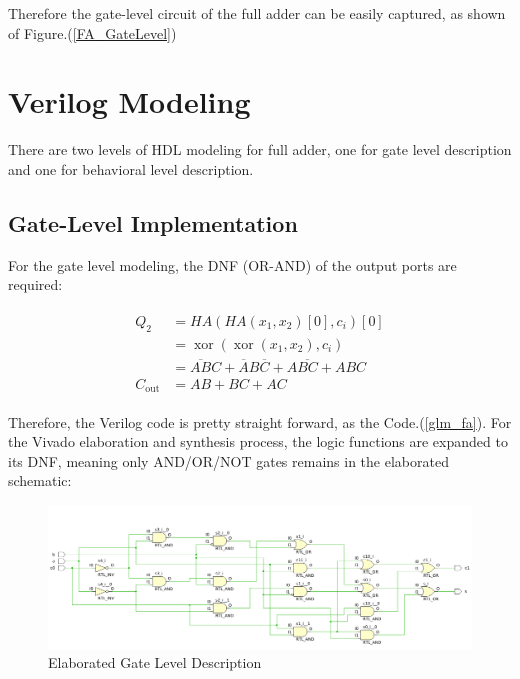 \documentclass[conference]{IEEEtran}
\begin{document}
Therefore the gate-level circuit of the full adder can be easily captured, as shown of Figure.(\ref{FA_GateLevel})

\section{Verilog Modeling}

There are two levels of HDL modeling for full adder, one for gate level description and one for behavioral level description.

\subsection{Gate-Level Implementation}



For the gate level modeling, the DNF (OR-AND) of the output ports are required:

\begin{eqnarray}
	\begin{aligned}
		Q_2              & =HA(HA(x_1,x_2)[0],c_i)[0]                                           \\
		                 & =\mathop{\mathrm{xor}}(\mathop{\mathrm{xor}}(x_1,x_2),c_i)           \\
		                 & = \overline{AB} C+\overline{A} B \overline{C} + A \overline{BC} +ABC \\
		C_{\mathrm{out}} & =AB+BC+AC
	\end{aligned}
\end{eqnarray}

Therefore, the Verilog code is pretty straight forward, as the Code.(\ref{glm_fa}). For the Vivado elaboration and synthesis process, the logic functions are expanded to its DNF, meaning only AND/OR/NOT gates remains in the elaborated schematic:

\begin{figure}[htpb]
	\begin{center}
		\includegraphics[width=0.97\linewidth]{report_lab2.assets/20240307171752.png}
		\caption{Elaborated Gate Level Description}
		\label{elaborated_gl_sch}
	\end{center}
\end{figure}
\end{document}
